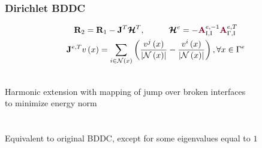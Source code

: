 \documentclass{beamer}
\begin{document}

\begin{frame}
\begin{center}
\frametitle{Dirichlet BDDC}

\begin{equation}
\begin{gathered}
\mathbf{R}_2 = \mathbf{R}_1 - \mathbf{J}^T \boldsymbol{\mathcal{H}}^T, \hspace{10mm} \boldsymbol{\mathcal{H}}^e = - {\color{burgundy}\mathbf{A}}_{\text{I}, \text{I}}^{e, -1} {\color{burgundy}\mathbf{A}}_{\Gamma, \text{I}}^{e, T}\\
\mathbf{J}^{e, T} v \left( x \right) = \sum_{i \in \mathcal{N} \left( x \right)} \left( \frac{v^j \left( x \right)}{\lvert \mathcal{N} \left( x \right) \rvert} - \frac{v^i \left( x \right)}{\lvert \mathcal{N} \left( x \right) \rvert} \right), \forall x \in \Gamma^e
\end{gathered}
\end{equation}

~\\

Harmonic extension with mapping of jump over broken interfaces\\to minimize energy norm\\

~\\

~\\

Equivalent to original BDDC, except for some eigenvalues equal to $1$ \cite{li2007use}

\end{center}
\end{frame}

\end{document}
